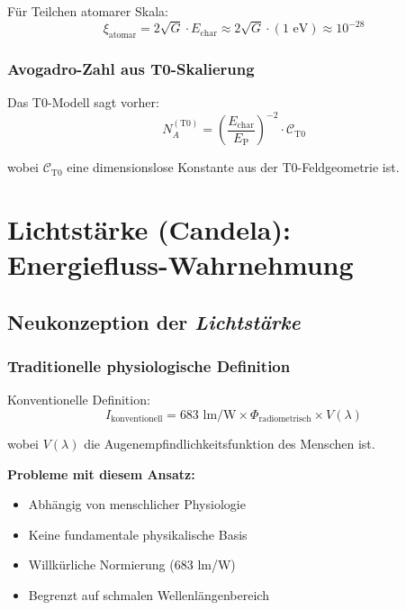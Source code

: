 \documentclass[12pt,a4paper]{article}
\newcommand{\xipar}{\xi}
\newcommand{\EP}{E_{\text{P}}}
\newcommand{\Echar}{E_{\text{char}}}
\begin{document}
	Für Teilchen atomarer Skala:
	\begin{equation}
		\xipar_{\text{atomar}} = 2\sqrt{G} \cdot \Echar \approx 2\sqrt{G} \cdot (1 \text{ eV}) \approx 10^{-28}
		\label{eq:xi_atomar}
	\end{equation}
	
	\subsubsection{Avogadro-Zahl aus T0-Skalierung}
	\label{subsubsec:avogadro_t0}
	
	Das T0-Modell sagt vorher:
	\begin{equation}
		N_A^{(\text{T0})} = \left(\frac{\Echar}{\EP}\right)^{-2} \cdot \mathcal{C}_{\text{T0}}
		\label{eq:avogadro_t0_vorhersage}
	\end{equation}
	
	wobei $\mathcal{C}_{\text{T0}}$ eine dimensionslose Konstante aus der T0-Feldgeometrie ist.
	
	\section{Lichtstärke (Candela): Energiefluss-Wahrnehmung}
	\label{sec:candela_herleitung}
	
	\subsection{Neukonzeption der \textit{Lichtstärke}}
	\label{subsec:neukonzeption_lichtstaerke}
	
	\subsubsection{Traditionelle physiologische Definition}
	\label{subsubsec:traditionelle_lichtstaerke}
	
	Konventionelle Definition:
	\begin{equation}
		I_{\text{konventionell}} = 683 \text{ lm/W} \times \Phi_{\text{radiometrisch}} \times V(\lambda)
		\label{eq:konventionelle_candela}
	\end{equation}
	
	wobei $V(\lambda)$ die Augenempfindlichkeitsfunktion des Menschen ist.
	
	\textbf{Probleme mit diesem Ansatz:}
	\begin{itemize}
		\item Abhängig von menschlicher Physiologie
		\item Keine fundamentale physikalische Basis
		\item Willkürliche Normierung (683 lm/W)
		\item Begrenzt auf schmalen Wellenlängenbereich
	\end{itemize}
	
\end{document}
